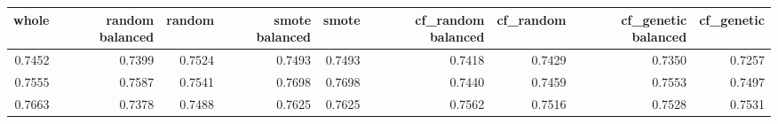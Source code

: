 \begin{tabular}{rrrrrrrrr}
\toprule

 whole &  random balanced &  random &  smote balanced &  smote &  cf\_random balanced &  cf\_random &  cf\_genetic balanced &  cf\_genetic \\
\midrule

0.7452 &           0.7399 &  0.7524 &          0.7493 & 0.7493 &              0.7418 &     0.7429 &               0.7350 &      0.7257 \\
0.7555 &           0.7587 &  0.7541 &          0.7698 & 0.7698 &              0.7440 &     0.7459 &               0.7553 &      0.7497 \\
0.7663 &           0.7378 &  0.7488 &          0.7625 & 0.7625 &              0.7562 &     0.7516 &               0.7528 &      0.7531 \\

\bottomrule
\end{tabular}
